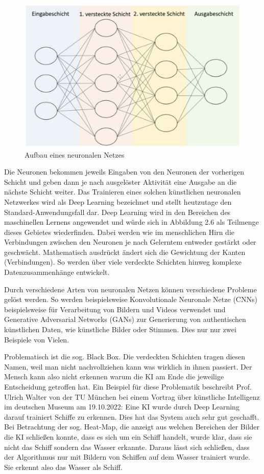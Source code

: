 \documentclass[a4paper,12pt, german]{report}
\begin{document}
\begin{figure}[H]
  \center
 \includegraphics[width=12cm]{images/KNN-Schichten.png}
  \caption[Aufbau eines neuronalen Netzes]{Aufbau eines neuronalen Netzes \cite{17}}
\end{figure}

Die Neuronen bekommen jeweils Eingaben von den Neuronen der vorherigen Schicht und geben dann je nach ausgelöster Aktivität eine Ausgabe an die nächste Schicht weiter. Das Trainieren eines solchen künstlichen neuronalen Netzwerkes wird als Deep Learning bezeichnet und stellt heutzutage den Standard-Anwendungsfall dar. Deep Learning wird in den Bereichen des maschinellen Lernens angewendet und würde sich in Abbildung 2.6 als Teilmenge dieses Gebietes wiederfinden. Dabei werden wie im menschlichen Hirn die Verbindungen zwischen den Neuronen je nach Gelerntem entweder gestärkt oder geschwächt. Mathematisch ausdrückt ändert sich die Gewichtung der Kanten (Verbindungen). So werden über viele verdeckte Schichten hinweg komplexe Datenzusammenhänge entwickelt.\cite{17}


Durch verschiedene Arten von neuronalen Netzen können verschiedene Probleme gelöst werden. So werden beispielsweise Konvolutionale Neuronale Netze (CNNs) beispielsweise für Verarbeitung von Bildern und Videos verwendet und Generative Adversarial Networks (GANs) zur Generierung von authentischen künstlichen Daten, wie künstliche Bilder oder Stimmen. Dies nur nur zwei Beispiele von Vielen.

Problematisch ist die sog. Black Box. Die verdeckten Schichten tragen diesen Namen, weil man nicht nachvollziehen kann was wirklich in ihnen passiert. Der Mensch kann also nicht erkennen warum die KI am Ende die jeweilige Entscheidung getroffen hat. Ein Beispiel für diese Problematik beschreibt Prof. Ulrich Walter von der TU München bei einem Vortrag über künstliche Intelligenz im deutschen Museum am 19.10.2022: Eine KI wurde durch Deep Learning darauf trainiert Schiffe zu erkennen. Dies hat das System auch sehr gut geschafft. Bei Betrachtung der sog. Heat-Map, die anzeigt aus welchen Bereichen der Bilder die KI schließen konnte, dass es sich um ein Schiff handelt, wurde klar, dass sie nicht das Schiff sondern das Wasser erkannte. Daraus lässt sich schließen, dass der Algorithmus nur mit Bildern von Schiffen auf dem Wasser trainiert wurde. Sie erkennt also das Wasser als Schiff.
\end{document}
